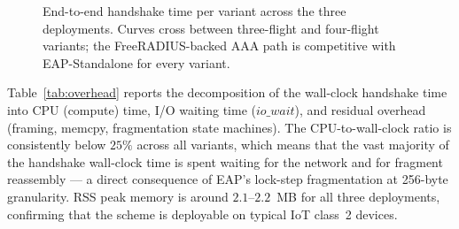 \documentclass{easychair}
\begin{document}
\begin{figure}[H]
\centering
{}
\caption{End-to-end handshake time per variant across the three
deployments. Curves cross between three-flight and four-flight
variants; the FreeRADIUS-backed AAA path is competitive with
EAP-Standalone for every variant.}
\label{fig:handshake-line}
\end{figure}
\FloatBarrier
Table~\ref{tab:overhead} reports the decomposition of the wall-clock
handshake time into CPU (compute) time, I/O waiting time
($\mathit{io\_wait}$), and residual overhead (framing, memcpy,
fragmentation state machines). The CPU-to-wall-clock ratio is
consistently below $25\%$ across all variants, which means that the
vast majority of the handshake wall-clock time is spent waiting for
the network and for fragment reassembly --- a direct consequence of
EAP's lock-step fragmentation at 256-byte granularity. RSS peak memory
is around $2.1$--$2.2$~MB for all three deployments, confirming that
the scheme is deployable on typical IoT class~2 devices.
\end{document}
